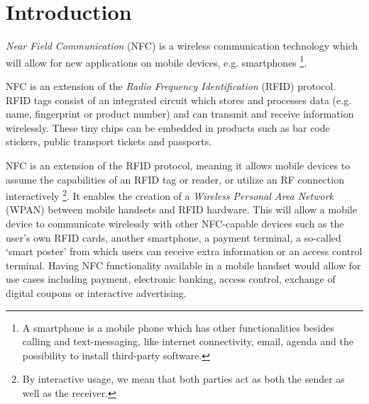 \section{Introduction}


\textit{Near Field Communication} (NFC) is a wireless communication technology which will allow for new applications on mobile devices, e.g. smartphones \footnote{A smartphone is a mobile phone which has other functionalities besides calling and text-messaging, like internet connectivity, email, agenda and the possibility to install third-party software.}.

NFC is an extension of the \textit{Radio Frequency Identification} (RFID) protocol.
RFID tags consist of an integrated circuit which stores and processes data (e.g. name, fingerprint or product number) and can transmit and receive information wirelessly. %
These tiny chips can be embedded in products such as bar code stickers, public transport tickets and passports.

 
NFC is an extension of the RFID protocol, meaning it allows mobile devices to assume the capabilities of an RFID tag or reader, or utilize an RF connection interactively \footnote{By interactive usage, we mean that both parties act as both the sender as well as the receiver.}.
It enables the creation of a \textit{Wireless Personal Area Network} (WPAN) between mobile handsets and RFID hardware.
This will allow a mobile device to communicate wirelessly with other NFC-capable devices such as the user's own RFID cards, another smartphone, a payment terminal, a so-called `smart poster' from which users can receive extra information or an access control terminal.
Having NFC functionality available in a mobile handset would allow for use cases including payment, electronic banking, access control, exchange of digital coupons or interactive advertising.

